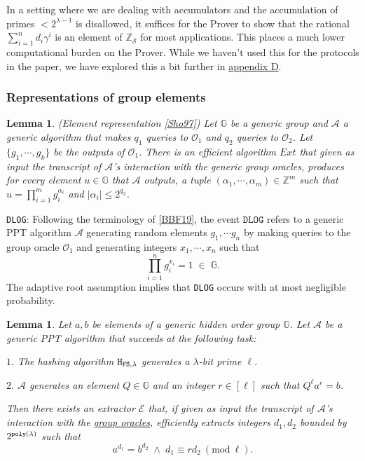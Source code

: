 \documentclass[11pt, lettersize, notitlepage, leqno, footskip=0.6cm]{article}
\newcommand{\bz}{\mathbb Z}
\newcommand{\pl}{\prod\limits}
\newcommand{\ttt}{\texttt}
\newcommand{\bG}{\mathbb{G}}
\newcommand{\mc}{\mathcal}
\newcommand{\mb}{\mathbb}
\newcommand{\al}{\alpha}
\newcommand{\lam}{\lambda}
\newcommand{\bzs}{\bz_{\mc{S}}}
\newcommand{\A}{\mc{A}}
\newcommand{\vs}{\vspace{-0.15cm}}
\newcommand{\noin}{\noindent}
\newcommand{\Mod}[1]{\ (\mathrm{mod}\ #1)}
\newcommand{\E}{\mc{E}}
\newtheorem{Lem}[Thm]{Lemma}
\numberwithin{equation}{section}
\begin{document}
In a setting where we are dealing with accumulators and the accumulation of primes $< 2^{\lam-1}$ is disallowed, it suffices for the Prover to show that the rational $\sum_{i=1}^n d_i{\gamma^i}$ is an element of $\bzs$ for most applications. This places a much lower computational burden on the Prover. While we haven't used this for the protocols in the paper, we have explored this a bit further in \hyperlink{shortcut}{appendix D}.


\subsubsection{\fontsize{11}{11}\selectfont Representations of group elements  }


\begin{Lem} {\normalfont (Element representation \hyperlink{Sho97}{[Sho97]})} Let $\bG$ be a generic group and $\A$ a generic algorithm that makes $q_1$ queries to $\mc{O}_1$ and $q_2$ queries to $\mc{O}_2$. Let $\{g_1,\cdots,g_k \}$ be the outputs of $\mc{O}_1$. There is an efficient algorithm $Ext$ that given as input the transcript of $\A$'s interaction with the generic group oracles, produces for every element $u\in \bG$ that $\A$ outputs, a tuple $(\al_1,\cdots,\al_m)\in \bz^m$ such that $u = \prod_{i=1}^m g_i^{\al_i}$ and $|\al_i| \leq 2^{q_2} $. \end{Lem} \vspace{0.1cm}


\noin \hypertarget{DLOG}{\ttt{DLOG}}: Following the terminology of \hyperlink{BBF19}{[BBF19]}, {the event $\ttt{DLOG}$} refers to a generic PPT algorithm $\mc{A}$ generating random elements $g_1,\cdots g_n$ by making queries to the group oracle $\mc{O}_1$ and generating integers $x_1,\cdots,x_n$ such that \vs $$\pl_{i=1}^n g_i^{x_i} = 1\;\in\;\bG .$$ The adaptive root assumption implies that \verb|DLOG| occurs with at most negligible probability.


\begin{Lem}\label{root} Let $a, b$ be elements of a generic hidden order group $\bG$. Let $\mc{A}$ be a generic PPT algorithm that succeeds at the following task:

\noin $1.$ The hashing algorithm ${\tt{H}}_{{\tt{FS}},\lam}$ generates a $\lam$-bit prime $\ell$.

\noin $2.$ $\mc{A}$ generates an element $Q\in \mb{G}$ and an integer $r\in [\ell]$ such that $Q^{\ell}a^r = b$.

\noin Then there exists an extractor \hspace{0.05cm}$\E$ that, if given as input the transcript of $\A$'s interaction with the \hyperlink{Oracles}{group oracles}, efficiently extracts integers $d_1,d_2$ bounded by $2^{\tt{poly}(\lam)}$ such that \vs $$a^{d_1} = b^{d_2}\;\wedge\;d_1\equiv rd_2\Mod{\ell}.$$\end{Lem}
\end{document}
